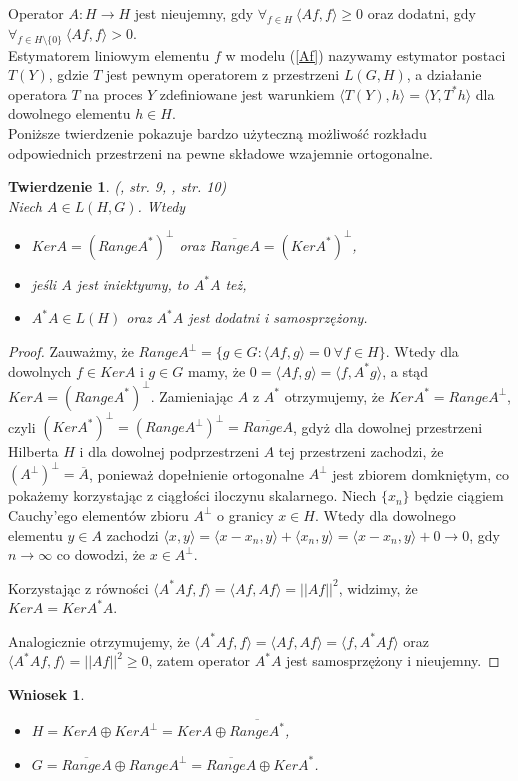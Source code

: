 \documentclass{mwart}
\newtheorem{tw}{Twierdzenie}
\newtheorem{wn}{Wniosek}
\begin{document}
Operator $A\colon H\to H$ jest nieujemny, gdy $\forall_{f\in H}\ \langle Af,f\rangle\geq 0$ oraz dodatni, gdy $\forall_{f\in H\setminus \{0\}}\ \langle Af,f\rangle> 0$.\\


Estymatorem liniowym elementu $f$ w modelu (\ref{Af}) nazywamy estymator postaci $T(Y)$, gdzie $T$ jest pewnym operatorem z przestrzeni $L(G,H)$, a działanie operatora $T$ na proces $Y$ zdefiniowane jest warunkiem $\langle T(Y),h\rangle =\langle Y,T^*h\rangle$ dla dowolnego elementu $h\in H$.\\


Poniższe twierdzenie pokazuje bardzo użyteczną możliwość rozkładu odpowiednich przestrzeni na pewne składowe wzajemnie ortogonalne.

\begin{tw}(\cite{iphde}, str. 9, \cite{kaipo}, str. 10)\\
Niech $A\in L(H,G)$. Wtedy
\begin{itemize}
\item $KerA=(RangeA^*)^{\perp}$ oraz $\overline{RangeA}=(KerA^*)^{\perp}$,
\item jeśli $A$ jest iniektywny, to $A^*A$ też,
\item $A^*A\in L(H)$ oraz $A^*A$ jest dodatni i samosprzężony.
\end{itemize}
\end{tw}
\begin{proof}
Zauważmy, że $RangeA^{\perp}=\{g\in G\colon \langle Af,g\rangle =0\ \forall f\in H\}$. Wtedy dla dowolnych $f\in KerA$ i $g\in G$ mamy, że $0=\langle Af,g\rangle=\langle f,A^*g\rangle$, a stąd $KerA=(RangeA^*)^{\perp}$. Zamieniając $A$ z $A^*$ otrzymujemy, że $KerA^*=RangeA^{\perp}$, czyli $(KerA^*)^{\perp}=(RangeA^{\perp})^{\perp}=\overline{RangeA}$, gdyż dla dowolnej przestrzeni Hilberta $H$ i dla dowolnej podprzestrzeni $A$ tej przestrzeni zachodzi, że $(A^{\perp})^{\perp}=\overline{A}$, ponieważ dopełnienie ortogonalne $A^{\perp}$ jest zbiorem domkniętym, co pokażemy korzystając z ciągłości iloczynu skalarnego. Niech $\{x_n\}$ będzie ciągiem Cauchy'ego elementów zbioru $A^{\perp}$ o granicy $x\in H$. Wtedy dla dowolnego elementu $y\in A$ zachodzi $\langle x,y\rangle=\langle x-x_n,y\rangle + \langle x_n,y\rangle=\langle x-x_n,y\rangle + 0\to 0$, gdy $n\to \infty$ co dowodzi, że $x\in A^{\perp}$.

Korzystając z równości $\langle A^*Af,f\rangle=\langle Af,Af\rangle=||Af||^2$, widzimy, że $KerA=KerA^*A$.

Analogicznie otrzymujemy, że $\langle A^*Af,f\rangle=\langle Af,Af\rangle=\langle f, A^*Af\rangle$ oraz $\langle A^*Af, f\rangle=||Af||^2\geq 0$, zatem operator $A^*A$ jest samosprzężony i nieujemny.
\end{proof}
\begin{wn}
\begin{itemize}
\item $H=KerA \oplus KerA^{\perp}=KerA\oplus \overline{RangeA^*}$,
\item $G=\overline{RangeA}\oplus RangeA^{\perp}=\overline{RangeA}\oplus KerA^*$.
\end{itemize}
\end{wn}
\end{document}
